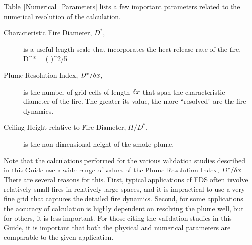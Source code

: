 Table~\ref{Numerical_Parameters} lists a few important parameters related to the numerical resolution of the calculation.
\begin{description}
\item[Characteristic Fire Diameter, $D^*$,] is a useful length scale that incorporates the heat release rate of the fire.
\be D^* = \left(  \right)^{2/5}  \ee
\item[Plume Resolution Index, $D^*/\delta x$,] is the number of grid cells of length $\delta x$ that span the characteristic diameter of the fire. The greater its value, the more ``resolved'' are the fire dynamics.
\item[Ceiling Height relative to Fire Diameter, $H/D^*$,] is the non-dimensional height of the smoke plume.
\end{description}
Note that the calculations performed for the various validation studies described in this Guide use a wide range of values of the Plume Resolution Index, $D^*/\delta x$. There are several reasons for this. First, typical applications of FDS often involve relatively small fires in relatively large spaces, and it is impractical to use a very fine grid that captures the detailed fire dynamics. Second, for some applications the accuracy of calculation is highly dependent on resolving the plume well, but for others, it is less important. For those citing the validation studies in this Guide, it is important that both the physical and numerical parameters are comparable to the given application.

\newpage

